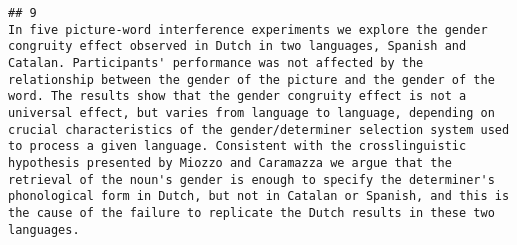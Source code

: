 \documentclass[
  english,
  man]{apa6}
\begin{document}
\begin{verbatim}
## 9                                                                                                                                                                                                                                                                                                                                                                                                                                                                                                                                                                                                                                                                                                                                                                                                                                                                                                                                                                                                                                                                                                                                                                                                                                                                                                                                                                                                                                                                                                                                                                                                                                                                                                                                                                                                                              In five picture-word interference experiments we explore the gender congruity effect observed in Dutch in two languages, Spanish and Catalan. Participants' performance was not affected by the relationship between the gender of the picture and the gender of the word. The results show that the gender congruity effect is not a universal effect, but varies from language to language, depending on crucial characteristics of the gender/determiner selection system used to process a given language. Consistent with the crosslinguistic hypothesis presented by Miozzo and Caramazza we argue that the retrieval of the noun's gender is enough to specify the determiner's phonological form in Dutch, but not in Catalan or Spanish, and this is the cause of the failure to replicate the Dutch results in these two languages.

\end{verbatim}
\end{document}
